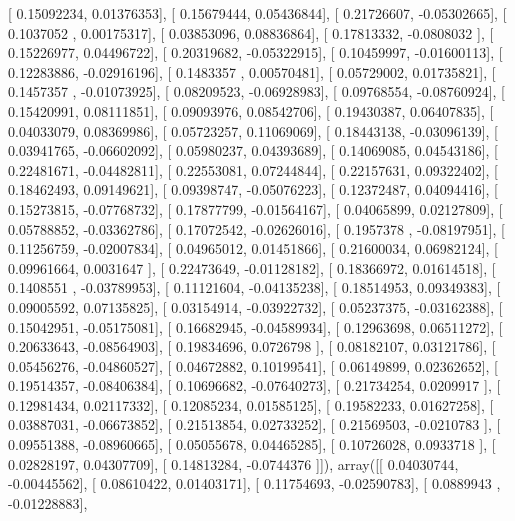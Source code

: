 \documentclass{article}
\begin{document}
       [ 0.15092234,  0.01376353],
       [ 0.15679444,  0.05436844],
       [ 0.21726607, -0.05302665],
       [ 0.1037052 ,  0.00175317],
       [ 0.03853096,  0.08836864],
       [ 0.17813332, -0.0808032 ],
       [ 0.15226977,  0.04496722],
       [ 0.20319682, -0.05322915],
       [ 0.10459997, -0.01600113],
       [ 0.12283886, -0.02916196],
       [ 0.1483357 ,  0.00570481],
       [ 0.05729002,  0.01735821],
       [ 0.1457357 , -0.01073925],
       [ 0.08209523, -0.06928983],
       [ 0.09768554, -0.08760924],
       [ 0.15420991,  0.08111851],
       [ 0.09093976,  0.08542706],
       [ 0.19430387,  0.06407835],
       [ 0.04033079,  0.08369986],
       [ 0.05723257,  0.11069069],
       [ 0.18443138, -0.03096139],
       [ 0.03941765, -0.06602092],
       [ 0.05980237,  0.04393689],
       [ 0.14069085,  0.04543186],
       [ 0.22481671, -0.04482811],
       [ 0.22553081,  0.07244844],
       [ 0.22157631,  0.09322402],
       [ 0.18462493,  0.09149621],
       [ 0.09398747, -0.05076223],
       [ 0.12372487,  0.04094416],
       [ 0.15273815, -0.07768732],
       [ 0.17877799, -0.01564167],
       [ 0.04065899,  0.02127809],
       [ 0.05788852, -0.03362786],
       [ 0.17072542, -0.02626016],
       [ 0.1957378 , -0.08197951],
       [ 0.11256759, -0.02007834],
       [ 0.04965012,  0.01451866],
       [ 0.21600034,  0.06982124],
       [ 0.09961664,  0.0031647 ],
       [ 0.22473649, -0.01128182],
       [ 0.18366972,  0.01614518],
       [ 0.1408551 , -0.03789953],
       [ 0.11121604, -0.04135238],
       [ 0.18514953,  0.09349383],
       [ 0.09005592,  0.07135825],
       [ 0.03154914, -0.03922732],
       [ 0.05237375, -0.03162388],
       [ 0.15042951, -0.05175081],
       [ 0.16682945, -0.04589934],
       [ 0.12963698,  0.06511272],
       [ 0.20633643, -0.08564903],
       [ 0.19834696,  0.0726798 ],
       [ 0.08182107,  0.03121786],
       [ 0.05456276, -0.04860527],
       [ 0.04672882,  0.10199541],
       [ 0.06149899,  0.02362652],
       [ 0.19514357, -0.08406384],
       [ 0.10696682, -0.07640273],
       [ 0.21734254,  0.0209917 ],
       [ 0.12981434,  0.02117332],
       [ 0.12085234,  0.01585125],
       [ 0.19582233,  0.01627258],
       [ 0.03887031, -0.06673852],
       [ 0.21513854,  0.02733252],
       [ 0.21569503, -0.0210783 ],
       [ 0.09551388, -0.08960665],
       [ 0.05055678,  0.04465285],
       [ 0.10726028,  0.0933718 ],
       [ 0.02828197,  0.04307709],
       [ 0.14813284, -0.0744376 ]]), array([[ 0.04030744, -0.00445562],
       [ 0.08610422,  0.01403171],
       [ 0.11754693, -0.02590783],
       [ 0.0889943 , -0.01228883],
\end{document}
